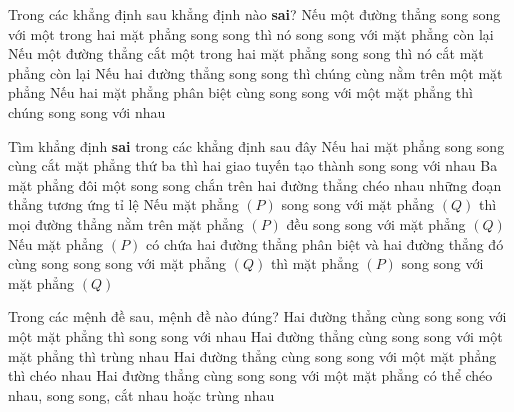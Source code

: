 	\begin{ex}%
		Trong các khẳng định sau khẳng định nào \textbf{sai}?
		\choice
		{\True Nếu một đường thẳng song song với một trong hai mặt phẳng song song thì nó song song với mặt phẳng còn lại}
		{Nếu một đường thẳng cắt một trong hai mặt phẳng song song thì nó cắt mặt phẳng còn lại}
		{Nếu hai đường thẳng song song thì chúng cùng nằm trên một mặt phẳng}
		{Nếu hai mặt phẳng phân biệt cùng song song với một mặt phẳng thì chúng song song với nhau}
	\end{ex}

	\begin{ex}%
		Tìm khẳng định \textbf{sai} trong các khẳng định sau đây
		\choice
		{Nếu hai mặt phẳng song song cùng cắt mặt phẳng thứ ba thì hai giao tuyến tạo thành song song với nhau}
		{Ba mặt phẳng đôi một song song chắn trên hai đường thẳng chéo nhau những đoạn thẳng tương ứng tỉ lệ}
		{Nếu mặt phẳng $(P)$ song song với mặt phẳng $(Q)$ thì mọi đường thẳng nằm trên mặt phẳng $(P)$ đều song song với mặt phẳng $(Q)$}
		{\True Nếu mặt phẳng $(P)$ có chứa hai đường thẳng phân biệt và hai đường thẳng đó cùng song song song với mặt phẳng $(Q)$ thì mặt phẳng $(P)$ song song với mặt phẳng $(Q)$}
	\end{ex}

	\begin{ex}%
		Trong các mệnh đề sau, mệnh đề nào đúng?
		\choice
		{Hai đường thẳng cùng song song với một mặt phẳng thì song song với nhau}
		{Hai đường thẳng cùng song song với một mặt phẳng thì trùng nhau}
		{Hai đường thẳng cùng song song với một mặt phẳng thì chéo nhau}
		{\True Hai đường thẳng cùng song song với một mặt phẳng có thể chéo nhau, song song, cắt nhau hoặc trùng nhau}
	\end{ex}

